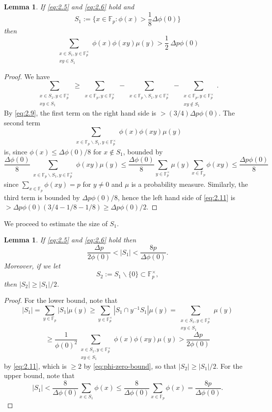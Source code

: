 \documentclass[11pt]{amsart}
\newtheorem{lem}[thm]{Lemma}
\newcommand{\fp}{\mathbb{F}_p}
\begin{document}
\begin{lem} If \eqref{eq:2.5} and \eqref{eq:2.6} hold and
$$
S_1 := \{ x \in \fp : \phi(x) > \frac{1}{8} \Delta \phi(0) \}
$$
then
\begin{equation} \label{eq:2.11}
\sum_{\substack{x \in S_1, y \in \fp^\times \\ xy \in S_1}} \phi(x)
\phi(xy) \mu(y) > \frac 12 \ \Delta p \phi(0)
\end{equation}
\end{lem}
\begin{proof}
We have
$$
\sum_{\substack{x \in S_1, y \in \fp^\times \\ xy \in S_1}} \geq
\sum_{\substack{x \in \fp, y \in \fp^\times }} - \sum_{\substack{x
\in \fp \backslash S_1, y \in \fp^\times}} - \sum_{\substack{x \in
\fp, y \in \fp^\times \\ xy \not \in S_1}}.
$$
By \eqref{eq:2.9}, the first term on the right hand side is $>
(3/4)\Delta p \phi(0)$.  The second term
$$
\sum_{\substack{x \in \fp \backslash S_1, y \in \fp^\times}} \phi(x)
\phi(xy) \mu(y)
$$
is, since $\phi(x) \leq \Delta\phi(0)/8$ for $x \not \in S_1$,
bounded by
$$
\frac{\Delta\phi(0)}{8} \sum_{\substack{x \in \fp \backslash S_1, y
\in \fp^\times}} \phi(xy) \mu(y) \leq \frac{ \Delta\phi(0)}{8}
\sum_{y \in \fp^\times} \mu(y) \sum_{x \in \fp} \phi(xy) \leq \frac{
\Delta p\phi(0)} {8}
$$
since $\sum_{x \in \fp} \phi(xy) = p$ for $y \neq 0$ and $\mu$ is a
probability measure.  Similarly, the third term is bounded by $\Delta
p \phi(0)/8$, hence the left hand side of \eqref{eq:2.11} is $>
\Delta p\phi(0)(3/4-1/8-1/8) \geq \Delta p\phi(0)/2$.
\end{proof}

We proceed to estimate the size of $S_1$.

\begin{lem} If \eqref{eq:2.5} and \eqref{eq:2.6} hold then
\label{l:size-of-s1}
\begin{equation}
\label{eq:2.12} \frac{\Delta p}{2\phi(0)} < |S_1| < \frac{8
p}{\Delta \phi(0)} .
\end{equation}
Moreover, if we let
$$S_2 := S_1 \backslash \{ 0 \}\subset \fp^\times,$$ 
then $|S_2| \geq |S_1|/2$.
\end{lem}

\begin{proof} For the lower bound, note that
\begin{equation}
\label{eq:2.13} |S_1| = \sum_{y \in \fp} |S_1| \mu(y) \geq \sum_{y
\in \fp^\times} |S_1 \cap y^{-1}S_1| \mu(y) = \sum_{\substack{x \in
S_1, y \in \fp^\times \\ xy \in S_1} } \mu(y)
\end{equation}
$$
\geq \frac{1}{\phi(0)^2} \sum_{\substack{x \in S_1, y \in \fp^\times
\\ xy \in S_1} } \phi(x)\phi(xy) \mu(y) > \frac{\Delta p}{2\phi(0)}
$$
by \eqref{eq:2.11}, which is $\geq 2$ by \eqref{eq:phi-zero-bound},
so that $|S_2|\geq |S_1|/2$. For the upper bound, note that
$$
|S_1| < \frac{8 }{\Delta\phi(0)} \sum_{x \in S_1} \phi(x) \leq
\frac{8}{\Delta\phi(0)} \sum_{x \in \fp} \phi(x) = \frac{8 p}{\Delta
\phi(0)}.
$$
\end{proof}
\end{document}
